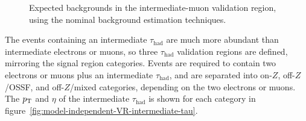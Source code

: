 \begin{figure}[tbp]
  \caption{Expected backgrounds in the intermediate-muon validation region, using the
    nominal background estimation techniques.}
  \label{fig:model-independent-VR-intermediate-mu}
\end{figure}

The events containing an intermediate $\tau_{\mathrm{had}}$ are much more abundant than intermediate electrons or muons, so three $\tau_{\mathrm{had}}$ validation regions are defined, mirroring the signal region categories. Events are required to contain two electrons or muons plus an intermediate $\tau_{\mathrm{had}}$, and are separated into on-$Z$, off-$Z$/OSSF, and off-$Z$/mixed categories, depending on the two electrons or muons. The $p_{\text{T}}$ and $\eta$ of the intermediate $\tau_{\mathrm{had}}$ is shown for each category in figure~\ref{fig:model-independent-VR-intermediate-tau}.

